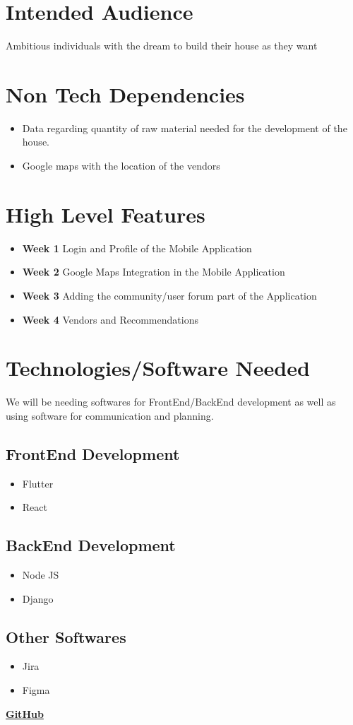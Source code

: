 \documentclass{article}
\begin{document}
\section{Intended Audience}
Ambitious individuals with the dream to build their house as they want

\section{Non Tech Dependencies}
\begin{itemize}
    \item Data regarding quantity of raw material needed for the development of the
          house.
    \item Google maps with the location of the vendors
\end{itemize}

\section{High Level Features}
\begin{itemize}
    \item \textbf{Week 1} Login and Profile of the Mobile Application
    \item \textbf{Week 2} Google Maps Integration in the Mobile Application
    \item \textbf{Week 3} Adding the community/user forum part of the Application
    \item \textbf{Week 4} Vendors and Recommendations
\end{itemize}

\section{Technologies/Software Needed}
We will be needing softwares for FrontEnd/BackEnd development as well as using
software for communication and planning.
\subsection{FrontEnd Development}
    \begin{itemize}
        \item Flutter
        \item React
    \end{itemize}
\subsection{BackEnd Development}
    \begin{itemize}
        \item Node JS
        \item Django
    \end{itemize}
\subsection{Other Softwares}
    \begin{itemize}
        \item Jira
        \item Figma 
    \end{itemize}

\href{github.com/aliasgharchakera/SE-Spring23-Project}{\textbf{GitHub}}
\end{document}
